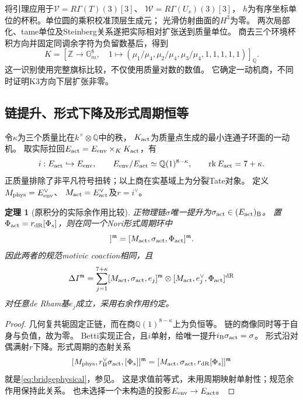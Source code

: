 \documentclass[11pt,a4paper]{ctexart}
\theoremstyle{cnplain}\newtheorem{theorem}{定理}[section]
\theoremstyle{definition}\newtheorem{definition}[theorem]{定义}
\theoremstyle{remark}\newtheorem{remark}[theorem]{注}
\begin{document}
将引理应用于$\mathcal V=R\Gamma(T)(3)[3]$、
$\mathcal W=R\Gamma(U_s)(3)[3]$，
$h$为有序坐标单位的杯积。单位圆的乘积校准顶层生成元；
光滑仿射曲面的$H^3$为零。
两次局部化、tame单位及Steinberg关系遂把实际相对扩张送到质量单位。
商去三个环境杯积方向并固定同调余字符为负留数基后，得到
\[
 K=\left[\mathbb Z\longrightarrow\mathbb G_m^8,\quad
 1\longmapsto
 (\mu_1/\mu_4,\mu_2/\mu_4,\mu_3/\mu_4,1,1,1,1,1)\right]_{\mathbb Q}.
\]
这一识别使用完整旗标比较\cite{BridgeAudit}，不仅使用质量对数的数值。
它确定一动机商，不同时证明K3方向下层扩张非零。

\subsection{链提升、形式下降及形式周期恒等}
令$\kappa$为三个质量比在$k^\times\otimes\mathbb Q$中的秩，
$K_{\rm act}$为质量点生成的最小连通子环面的一动机。
取实际拉回$E_{\rm act}=E_{\rm env}\times_KK_{\rm act}$，有
\[
 i:E_{\rm act}\hookrightarrow E_{\rm env},\qquad
 E_{\rm env}/E_{\rm act}\simeq\mathbb Q(1)^{8-\kappa},\qquad
 \operatorname{rk}E_{\rm act}=7+\kappa.
\]
正质量排除了非平凡符号扭转；以上商在实基域上为分裂Tate对象。
定义$M_{\rm phys}=E_{\rm env}^{\vee}$、
$M_{\rm act}=E_{\rm act}^{\vee}$及$r=i^\vee$。

\begin{theorem}[原积分的实际余作用比较]\label{thm:bridgephysical}
正物理链$\sigma$唯一提升为$\sigma_{\rm act}\in(E_{\rm act})_{\rm B}$。
置$\Phi_{\rm act}=r_{\rm dR}[\Phi_s]$，则在同一个Nori形式周期环中
\begin{equation}
 [M_{\rm phys},\sigma,[\Phi_s]]^{\mathfrak m}
 =
 [M_{\rm act},\sigma_{\rm act},\Phi_{\rm act}]^{\mathfrak m}.
 \label{eq:bridgephysical}
\end{equation}
因此两者的规范motivic coaction相同，且
\[
 \Delta I^{\mathfrak m}
 =\sum_{j=1}^{7+\kappa}
 [M_{\rm act},\sigma_{\rm act},e_j]^{\mathfrak m}
 \otimes[M_{\rm act},e_j^\vee,\Phi_{\rm act}]^{\rm dR}
\]
对任意de Rham基$e_j$成立，采用右余作用约定。
\end{theorem}
\begin{proof}
几何复共轭固定正链，而在商$\mathbb Q(1)^{8-\kappa}$上为负恒等。
链的商像同时等于自身与负值，故为零。
Betti实现正合，且$i$单射，给唯一提升$i_{\rm B}\sigma_{\rm act}=\sigma$。
形式沿对偶满射$r$下降。形式周期的态射关系
\[
 [M_{\rm phys},r_{\rm B}^{\vee}\sigma_{\rm act},[\Phi_s]]^{\mathfrak m}
 =
 [M_{\rm act},\sigma_{\rm act},r_{\rm dR}[\Phi_s]]^{\mathfrak m}
\]
就是\eqref{eq:bridgephysical}，参见\cite[\S2.3--2.4]{brown}。
这是求值前等式，未用周期映射单射性；规范余作用保持此关系。
也未选择一个未构造的投影$E_{\rm env}\to E_{\rm act}$。
\end{proof}
\end{document}
